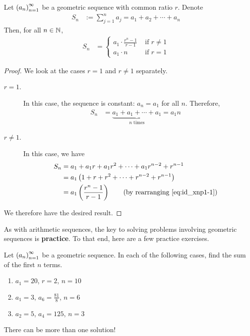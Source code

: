 \begin{theorem}
    Let $\left( a_n \right)_{n=1}^{\infty}$ be a geometric sequence with common ratio $r$. Denote
    \begin{align*}
        S_n &:= \sum_{j=1}^n a_j = a_1 + a_2 + \cdots + a_n
    \end{align*}
    Then, for all $n \in \mathbb{N}$,
    \begin{align}
        S_n &=
        \begin{cases}\displaystyle
            a_1 \cdot \frac{r^n - 1}{r - 1} & \text{ if } r \neq 1 \\
            a_1 \cdot n & \text{ if } r = 1
        \end{cases}
    \end{align}
\end{theorem}
\begin{proof}
    We look at the cases $r = 1$ and $r \neq 1$ separately.
    \begin{description}
        \item[\underline{$r = 1$}.] In this case, the sequence is constant: $a_n = a_1$ for all $n$. Therefore,
        \begin{align*}
            S_n &= \underbrace{a_1 + a_1 + \cdots + a_1}_{n \text{ times}} = a_1n
        \end{align*}
        \item[\underline{$r \neq 1$}.] In this case, we have
        \begin{align*}
            S_n &= a_1 + a_1 r + a_1 r^2 + \cdots + a_1 r^{n-2} + r^{n-1} \\
                &= a_1\left( 1 + r + r^2 + \cdots + r^{n-2} + r^{n-1} \right) \\
                &= a_1 \left( \frac{r^n - 1}{r - 1} \right) \quad \quad \text{(by rearranging \eqref{eq:id_xnp1-1})}
        \end{align*}
    \end{description}
    We therefore have the desired result.
\end{proof}

As with arithmetic sequences, the key to solving problems involving geometric sequences is \textbf{practice}. To that end, here are a few practice exercises.

\begin{boxexercise}
    Let $\left( a_n \right)_{n=1}^{\infty}$ be a geometric sequence. In each of the following cases, find the sum of the first $n$ terms.
    \begin{enumerate}[noitemsep]
        \item $a_1 = 20$, $r = 2$, $n = 10$
        \item $a_1 = 3$, $a_6 = \frac{81}{8}$, $n = 6$
        \item $a_2 = 5$, $a_{4} = 125$, $n = 3$
    \end{enumerate}
    \begin{hint}
        There can be more than one solution!
    \end{hint}
\end{boxexercise}

